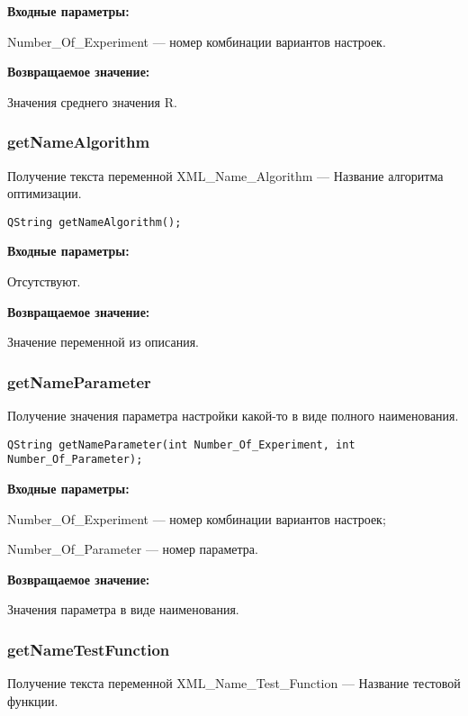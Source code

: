 \documentclass[a4paper,12pt]{article}
\begin{document}
\textbf{Входные параметры:}

Number\_Of\_Experiment --- номер комбинации вариантов настроек.

\textbf{Возвращаемое значение:}

Значения среднего значения R.


\subsubsection{getNameAlgorithm}\label{getNameAlgorithm}

Получение текста переменной  XML\_Name\_Algorithm --- Название алгоритма оптимизации.


\begin{lstlisting}[label=code_syntax_getNameAlgorithm,caption=Синтаксис]
QString getNameAlgorithm();
\end{lstlisting}

\textbf{Входные параметры:}

Отсутствуют.

\textbf{Возвращаемое значение:}

Значение переменной из описания.


\subsubsection{getNameParameter}\label{getNameParameter}

Получение значения параметра настройки какой-то в виде полного наименования.


\begin{lstlisting}[label=code_syntax_getNameParameter,caption=Синтаксис]
QString getNameParameter(int Number_Of_Experiment, int Number_Of_Parameter);
\end{lstlisting}

\textbf{Входные параметры:}

Number\_Of\_Experiment --- номер комбинации вариантов настроек;
 
Number\_Of\_Parameter --- номер параметра.

\textbf{Возвращаемое значение:}

Значения параметра в виде наименования.


\subsubsection{getNameTestFunction}\label{getNameTestFunction}

Получение текста переменной  XML\_Name\_Test\_Function --- Название тестовой функции.
\end{document}

